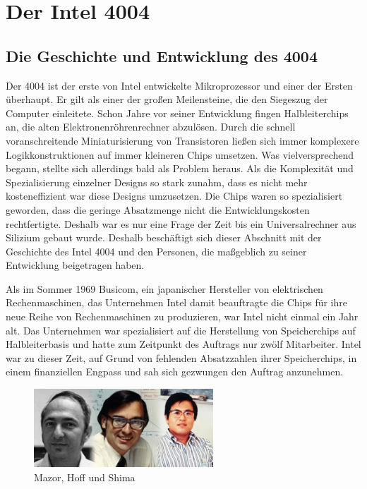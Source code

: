 \newpage
\chapter{Der Intel 4004}
\newpage
\section{Die Geschichte und Entwicklung des 4004}
Der 4004 ist der erste von Intel entwickelte Mikroprozessor und einer der Ersten überhaupt. Er gilt als einer der großen Meilensteine, die den Siegeszug der Computer einleitete. Schon Jahre vor seiner Entwicklung fingen Halbleiterchips an, die alten Elektronenröhrenrechner abzulösen. Durch die schnell voranschreitende Miniaturisierung von Transistoren ließen sich immer komplexere Logikkonstruktionen auf immer kleineren Chips umsetzen. Was vielversprechend begann, stellte sich allerdings bald als Problem heraus. Als die Komplexität und Spezialisierung einzelner Designs so stark zunahm, dass es nicht mehr kosteneffizient war diese Designs umzusetzen. Die Chips waren so spezialisiert geworden, dass die geringe Absatzmenge nicht die Entwicklungskosten rechtfertigte. Deshalb war es nur eine Frage der Zeit bis ein Universalrechner aus Silizium gebaut wurde. Deshalb beschäftigt sich dieser Abschnitt mit der Geschichte des Intel 4004 und den Personen, die maßgeblich zu seiner Entwicklung beigetragen haben.


Als im Sommer 1969 Busicom, ein japanischer Hersteller von elektrischen Rechenmaschinen, das Unternehmen Intel damit beauftragte die Chips für ihre neue Reihe von Rechenmaschinen zu produzieren, war Intel nicht  einmal ein Jahr alt. Das Unternehmen war spezialisiert auf die Herstellung von Speicherchips auf Halbleiterbasis und hatte zum Zeitpunkt des Auftrags nur zwölf Mitarbeiter. Intel war zu dieser Zeit, auf Grund von fehlenden Absatzzahlen ihrer Speicherchips, in einem finanziellen Engpass und sah sich gezwungen den Auftrag anzunehmen.
\vspace{-24pt}
\begin{figure}
	\vspace{20pt}
	\includegraphics[width=0.6\textwidth]{figures/creators1.jpeg}
	\caption{Mazor, Hoff und Shima}
	\label{fig:creators1}
	\vspace{-20pt}
\end{figure}

